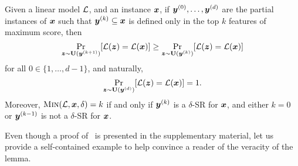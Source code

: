 \begin{lemma}\label{lemma:greedy}
    Given a linear model $\mathcal{L}$, and an instance ${\bm{x}}$, if ${\bm{y}}^{(0)}, \ldots, {\bm{y}}^{(d)}$ are the partial instances of ${\bm{x}}$ such that ${\bm{y}}^{(k)} \subseteq {\bm{x}}$ is defined only in the top $k$ features of maximum score, then
    \[ 
        \Pr_{{\bm{z}} \sim \mathbf{U}({\bm{y}}^{(k+1)})}[\mathcal{L}({\bm{z}}) = \mathcal{L}({\bm{x}})] \geq \Pr_{{\bm{z}} \sim \mathbf{U}({\bm{y}}^{(k)})}[\mathcal{L}({\bm{z}}) = \mathcal{L}({\bm{x}})]
    \]
    for all $0 \in \{1, \ldots, d-1\}$, and naturally, 
    \[ 
    \Pr_{{\bm{z}} \sim \mathbf{U}({\bm{y}}^{(d)})}[\mathcal{L}({\bm{z}}) = \mathcal{L}({\bm{x}})] = 1.
    \]
    Moreover, $\operatorname{\textsc{Min}}(\mathcal{L}, {\bm{x}}, \delta) = k$ if and only if ${\bm{y}}^{(k)}$ is a $\delta$-SR for ${\bm{x}}$, and either $k = 0$ or ${\bm{y}}^{(k-1)}$ is not a $\delta$-SR for ${\bm{x}}$. 
    \end{lemma}

Even though a proof of~ is presented in the supplementary material, let us provide a self-contained example to help convince a reader of the veracity of the lemma.
